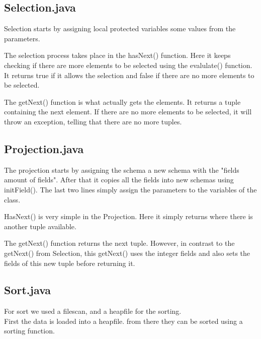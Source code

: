 \documentclass[a4paper,10pt,titlepage]{report}
\begin{document}
\subsection{Selection.java}
Selection starts by assigning local protected variables some values from the parameters. 

The selection process takes place in the hasNext() function. Here it keeps checking if there are more elements to be selected using the evalulate() function. It returns true if it allows the selection and false if there are no more elements to be selected.

The getNext() function is what actually gets the elements. It returns a tuple containing the next element. If there are no more elements to be selected, it will throw an exception, telling that there are no more tuples.

\vspace{10mm}
\subsection{Projection.java}
The projection starts by assigning the schema a new schema with the "fields amount of fields". After that it copies all the fields into new schemas using initField(). The last two lines simply assign the parameters to the variables of the class.

HasNext() is very simple in the Projection. Here it simply returns where there is another tuple available.

The getNext() function returns the next tuple. However, in contrast to the getNext() from Selection, this getNext() uses the integer fields and also sets the fields of this new tuple before returning it.



\subsection{Sort.java}
For sort we used a filescan, and a heapfile for the sorting. \\
First the data is loaded into a heapfile. from there they can be sorted using a sorting function.

\end{document}
